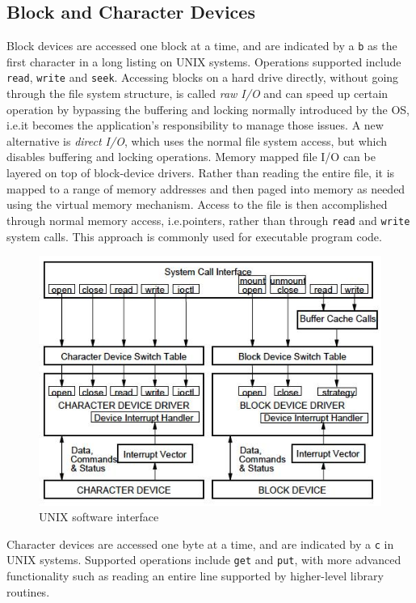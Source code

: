 \subsection{Block and Character Devices}
Block devices are accessed one block at a time, and are indicated by a \texttt{b} as the first character in a long listing on UNIX systems. Operations supported include \texttt{read}, \texttt{write} and \texttt{seek}. Accessing blocks on a hard drive directly, without going through the file system structure, is called \emph{raw I/O} and can speed up certain operation by bypassing the buffering and locking normally introduced by the OS, i.e.\@ it becomes the application's responsibility to manage those issues. A new alternative is \emph{direct I/O}, which uses the normal file system access, but which disables buffering and locking operations. Memory mapped file I/O can be layered on top of block-device drivers. Rather than reading the entire file, it is mapped to a range of memory addresses and then paged into memory as needed using the virtual memory mechanism. Access to the file is then accomplished through normal memory access, i.e.\@ pointers, rather than through \texttt{read} and \texttt{write} system calls. This approach is commonly used for executable program code.

\begin{figure}[hbtp]
\centering
\includegraphics[scale=0.4]{images/device_management/unix_sw_interface.jpg}
\caption{UNIX software interface}
\end{figure}

Character devices are accessed one byte at a time, and are indicated by a \texttt{c} in UNIX systems. Supported operations include \texttt{get} and \texttt{put}, with more advanced functionality such as reading an entire line supported by higher-level library routines.

